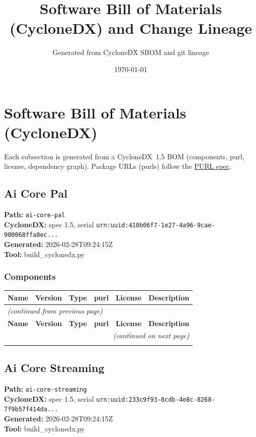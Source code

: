 \documentclass[11pt,a4paper]{article}
\title{\textbf{Software Bill of Materials (CycloneDX) and Change Lineage}}
\author{Generated from CycloneDX SBOM and git lineage}
\date{\today}
\begin{document}
\maketitle
\tableofcontents
\newpage
\section{Software Bill of Materials (CycloneDX)}
Each subsection is generated from a CycloneDX~1.5 BOM (components, purl, license, dependency graph). Package URLs (purls) follow the \href{https://github.com/package-url/purl-spec}{PURL spec}.

\subsection{Ai Core Pal}
\textbf{Path:} \texttt{ai-core-pal}
\\ \textbf{CycloneDX:} spec 1.5, serial \texttt{urn:uuid:410b06f7-1e27-4a96-9cae-900068ffa8ec...}
\\ \textbf{Generated:} 2026-02-28T09:24:15Z
\\ \textbf{Tool:} build\_cyclonedx.py

\subsubsection*{Components}
\begin{longtable}{|p{4cm}|p{2cm}|p{1.6cm}|p{5cm}|p{1.5cm}|p{3.5cm}|}
\toprule
\rowcolor{sbomhdr}\textbf{Name} & \textbf{Version} & \textbf{Type} & \textbf{purl} & \textbf{License} & \textbf{Description} \\
\midrule
\endfirsthead
\multicolumn{6}{l}{\small\itshape (continued from previous page)} \\
\toprule
\rowcolor{sbomhdr}\textbf{Name} & \textbf{Version} & \textbf{Type} & \textbf{purl} & \textbf{License} & \textbf{Description} \\
\midrule
\endhead
\midrule
\multicolumn{6}{r}{\small\itshape (continued on next page)} \\
\endfoot
\bottomrule
\endlastfoot
\end{longtable}

\subsection{Ai Core Streaming}
\textbf{Path:} \texttt{ai-core-streaming}
\\ \textbf{CycloneDX:} spec 1.5, serial \texttt{urn:uuid:233c9f93-8cdb-4e8c-8268-7f9b57f414da...}
\\ \textbf{Generated:} 2026-02-28T09:24:15Z
\\ \textbf{Tool:} build\_cyclonedx.py
\end{document}
